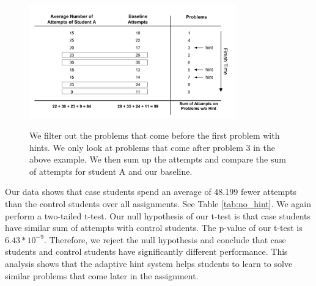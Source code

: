 \documentclass{llncs}
\begin{document}
\begin{figure}[ht]
   \centering
   \caption{We filter out the problems that come before the first problem with hints. We only look at problems that come after problem 3 in the above example. We then sum up the attempts and compare the sum of attempts for student A and our baseline.}
   \includegraphics[width=0.8\textwidth]{image/Filter_problems.png}
   \label{fig:pro_no_hint}
\end{figure}


Our data shows that case students spend an average of 48.199 fewer attempts than the control students over all assignments. See Table \ref{tab:no_hint}. We again perform a two-tailed t-test. Our null hypothesis of our t-test is that case students have similar sum of attempts with control students. The p-value of our t-test is $6.43 * 10^{-9}$. Therefore, we reject the null hypothesis and conclude that case students and control students have significantly different performance. This analysis shows that the adaptive hint system helps students to learn to solve similar problems that come later in the assignment. 
\end{document}
